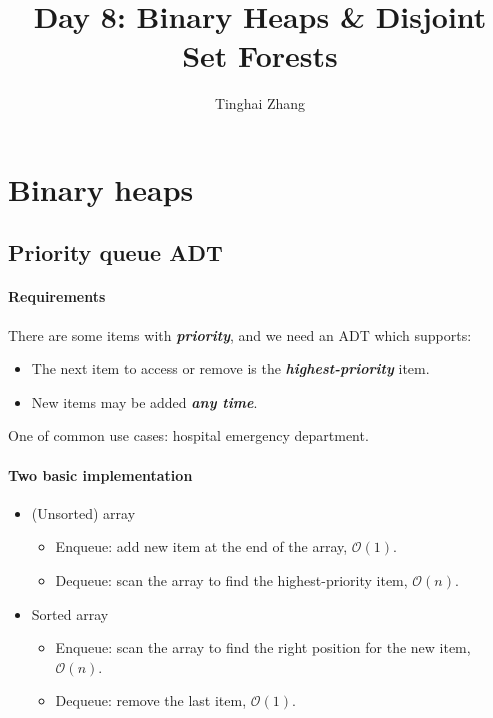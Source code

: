 \documentclass[12pt,a4paper]{ctexart}
\title{Day 8: Binary Heaps \& Disjoint Set Forests}
\author{Tinghai Zhang}
\newcommand{\highlight}[1]{\textbf{\textit{#1}}}
\begin{document}
    \renewcommand{\baselinestretch}{1}
    \setlength{\abovedisplayskip}{5pt}
    \setlength{\belowdisplayskip}{5pt}
    \pagestyle{plain}

    \maketitle

    \tableofcontents

    \section{Binary heaps}

    \subsection{Priority queue ADT}

    \paragraph{Requirements}

    There are some items with \highlight{priority}, and we need an ADT which supports:

    \begin{itemize}
        \item The next item to access or remove is the \highlight{highest-priority} item.
        \item New items may be added \highlight{any time}.
    \end{itemize}

    One of common use cases: hospital emergency department.

    \paragraph{Two basic implementation}

    \begin{itemize}
        \item (Unsorted) array
        \begin{itemize}[left=1em]
            \item Enqueue: add new item at the end of the array, $\mathcal O(1)$.
            \item Dequeue: scan the array to find the highest-priority item, $\mathcal O(n)$.
        \end{itemize}
        \item Sorted array
        \begin{itemize}[left=1em]
            \item Enqueue: scan the array to find the right position for the new item, $\mathcal O(n)$.
            \item Dequeue: remove the last item, $\mathcal O(1)$.
        \end{itemize}
    \end{itemize}
\end{document}
